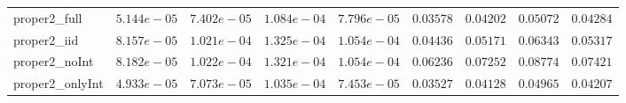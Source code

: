 \begin{table}
\begin{tabular}{lcccccccc}
proper2_full  & $5.144e-05$ & $7.402e-05$ & $1.084e-04$ & $7.796e-05$ & $0.03578$ & $0.04202$ & $0.05072$ & $0.04284$ \\
proper2_iid  & $8.157e-05$ & $1.021e-04$ & $1.325e-04$ & $1.054e-04$ & $0.04436$ & $0.05171$ & $0.06343$ & $0.05317$ \\
proper2_noInt  & $8.182e-05$ & $1.022e-04$ & $1.321e-04$ & $1.054e-04$ & $0.06236$ & $0.07252$ & $0.08774$ & $0.07421$ \\
proper2_onlyInt  & $4.933e-05$ & $7.073e-05$ & $1.035e-04$ & $7.453e-05$ & $0.03527$ & $0.04128$ & $0.04965$ & $0.04207$ \\
\hline 
\end{tabular}


\end{table}
